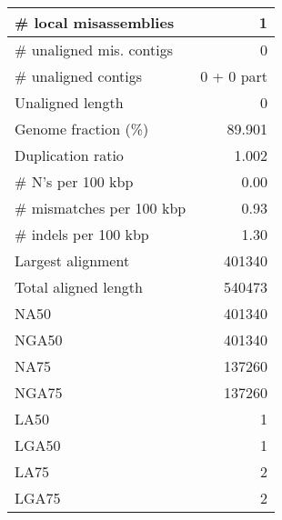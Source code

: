 \documentclass[12pt,a4paper]{article}
\begin{document}
\begin{table}[ht]
\begin{center}
\begin{tabular}{|l*{1}{|r}|}
\# local misassemblies & 1 \\ \hline
\# unaligned mis. contigs & 0 \\ \hline
\# unaligned contigs & 0 + 0 part \\ \hline
Unaligned length & 0 \\ \hline
Genome fraction (\%) & 89.901 \\ \hline
Duplication ratio & 1.002 \\ \hline
\# N's per 100 kbp & 0.00 \\ \hline
\# mismatches per 100 kbp & 0.93 \\ \hline
\# indels per 100 kbp & 1.30 \\ \hline
Largest alignment & 401340 \\ \hline
Total aligned length & 540473 \\ \hline
NA50 & 401340 \\ \hline
NGA50 & 401340 \\ \hline
NA75 & 137260 \\ \hline
NGA75 & 137260 \\ \hline
LA50 & 1 \\ \hline
LGA50 & 1 \\ \hline
LA75 & 2 \\ \hline
LGA75 & 2 \\ \hline
\end{tabular}
\end{center}
\end{table}
\end{document}
